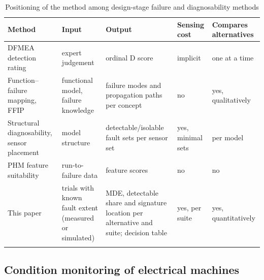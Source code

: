 \begin{table}[t]
\tabsize
\setlength{\tabcolsep}{4pt}
\caption{Positioning of the method among design-stage failure and diagnosability methods}\label{tab:positioning}
\begin{tabular}{@{}p{2.6cm}p{2.5cm}p{2.6cm}p{2.0cm}p{2.2cm}@{}}
\toprule
Method & Input & Output & Sensing cost & Compares alternatives \\
\midrule
DFMEA detection rating & expert judgement & ordinal D score & implicit & one at a time \\
Function--failure mapping, FFIP \citep{Stone2005, Kurtoglu2010} & functional model, failure knowledge & failure modes and propagation paths per concept & no & yes, qualitatively \\
Structural diagnosability, sensor placement \citep{Krysander2008, Blanke2016} & model structure & detectable/isolable fault sets per sensor set & yes, minimal sets & per model \\
PHM feature suitability \citep{Coble2013} & run-to-failure data & feature scores & no & no \\
This paper & trials with known fault extent (measured or simulated) & MDE, detectable share and signature location per alternative and suite; decision table & yes, per suite & yes, quantitatively \\
\botrule
\end{tabular}
\end{table}

\subsection{Condition monitoring of electrical machines}

